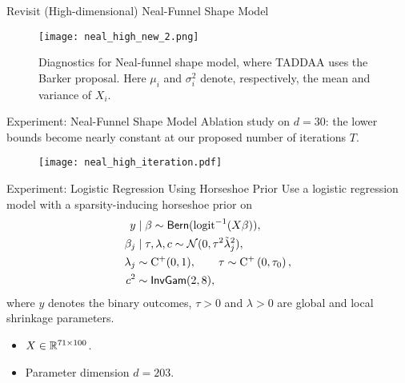\documentclass[10pt,xcolor=table]{beamer}
\begin{document}
\begin{frame}{Revisit (High-dimensional) Neal-Funnel Shape Model}
	\begin{figure}[t]
		\texttt{[image: neal\_high\_new\_2.png]}
		\caption{Diagnostics for Neal-funnel shape model, where 
			TADDAA uses the Barker proposal. 
			Here $\mu_{i}$ and $\sigma_{i}^{2}$ denote, respectively, the mean and variance of $X_{i}$. }
		\label{fig:High Dimensional Neal Funnel Diagnostics}
	\end{figure}
\end{frame}

\begin{frame}{Experiment: Neal-Funnel Shape Model}
Ablation study on $d=30$: the lower bounds become nearly constant at our proposed number of iterations $T$.
\begin{figure}
      \centering
      \texttt{[image: neal\_high\_iteration.pdf]}
\end{figure}
\end{frame}

\begin{frame}{Experiment: Logistic Regression Using Horseshoe Prior}
Use a logistic regression model with a sparsity-inducing horseshoe prior on 
\[
\begin{aligned}
    y &\mid \beta \sim {\sf{Bern}}(\operatorname{logit}^{-1}(X \beta)),\\
    \beta_{j} &\mid \tau, \lambda, c \sim \mathcal{N}(0, \tau^{2} \tilde{\lambda}_{j}^{2}), \\
    \lambda_{j} &\sim \mathrm{C}^{+}(0,1), \qquad \tau \sim \mathrm{C}^{+}\left(0, \tau_{0}\right), \\
    c^{2} &\sim {\sf{InvGam}}(2,8),
\end{aligned}
\]
where $y$ denotes the binary outcomes, $\tau >0 $ and $\lambda >0$ are global and local shrinkage parameters. 
\begin{itemize}
    \item $X \in \mathbb{R}^{71 \times 100}$.
    \item Parameter dimension $d = 203$.
\end{itemize}
\end{frame}
\end{document}
